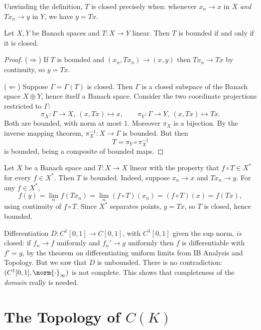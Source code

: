 \documentclass[a4paper]{scrartcl}
\begin{document}
Unwinding the definition, $T$ is closed precisely when: whenever $x_n \to x$ in $X$ \emph{and} $Tx_n \to y$ in $Y$, we have $y = Tx$.

\begin{theorem}
	Let $X, Y$ be Banach spaces and $T : X \to Y$ linear. Then $T$ is bounded if and only if it is closed.
\end{theorem}

\begin{proof}
	($\Rightarrow$) If $T$ is bounded and $(x_n, Tx_n) \to (x,y)$ then $Tx_n \to Tx$ by continuity, so $y = Tx$.

	($\Leftarrow$) Suppose $\Gamma = \Gamma(T)$ is closed. Then $\Gamma$ is a closed subspace of the Banach space $X \oplus Y$, hence itself a Banach space. Consider the two coordinate projections restricted to $\Gamma$:
	$$\pi_X : \Gamma \to X, \ (x,Tx)\mapsto x, \qquad \pi_Y : \Gamma \to Y, \ (x,Tx) \mapsto Tx.$$
	Both are bounded, with norm at most $1$. Moreover $\pi_X$ is a bijection. By the inverse mapping theorem, $\pi_X^{-1} : X \to \Gamma$ is bounded. But then
	$$T = \pi_Y \circ \pi_X^{-1}$$
	is bounded, being a composite of bounded maps.
\end{proof}

\begin{example}
	Let $X$ be a Banach space and $T : X \to X$ linear with the property that $f \circ T \in X^*$ for every $f \in X^*$. Then $T$ is bounded. Indeed, suppose $x_n \to x$ and $Tx_n \to y$. For any $f \in X^*$,
	$$f(y) = \lim_n f(Tx_n) = \lim_n (f\circ T)(x_n) = (f \circ T)(x) = f(Tx),$$
	using continuity of $f \circ T$. Since $X^*$ separates points, $y = Tx$, so $T$ is closed, hence bounded.
\end{example}

\begin{example}
	Differentiation $D : C^1[0,1] \to C[0,1]$, with $C^1[0,1]$ given the sup norm, \emph{is} closed: if $f_n \to f$ uniformly and $f_n' \to g$ uniformly then $f$ is differentiable with $f' = g$, by the theorem on differentiating uniform limits from IB Analysis and Topology. But we saw that $D$ is unbounded. There is no contradiction: $(C^1[0,1], \norm{\cdot}_\infty)$ is not complete. This shows that completeness of the \emph{domain} really is needed.
\end{example}

\section{The Topology of $C(K)$}
\end{document}
